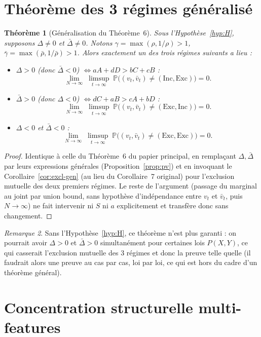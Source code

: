 \documentclass[12pt,a4paper]{article}
\newtheorem{theorem}{Théorème}[section]
\theoremstyle{remark}
\newtheorem{remark}[theorem]{Remarque}
\newcommand{\Inc}{\ensuremath{\mathrm{Inc}}}
\newcommand{\Exc}{\ensuremath{\mathrm{Exc}}}
\newcommand{\vbar}{\bar{v}}
\begin{document}
\section{Théorème des 3 régimes généralisé}

\begin{theorem}[Généralisation du Théorème~6]\label{thm:sel-gen}
Sous l'Hypothèse~\ref{hyp:H}, supposons $\Delta\ne0$ et $\bar\Delta\ne0$.
Notons $\gamma=\max(\rho,1/\rho)>1$, $\bar\gamma=\max(\bar\rho,1/\bar\rho)>1$.
Alors exactement un des trois régimes suivants a lieu :
\begin{itemize}
  \item $\Delta>0$ (donc $\bar\Delta<0$) $\iff aA+dD>bC+cB$ :
  \[
    \lim_{N\to\infty}\;\limsup_{t\to\infty}\;\mathbb P\bigl((v_t,\vbar_t)\ne(\Inc,\Exc)\bigr) = 0.
  \]
  \item $\bar\Delta>0$ (donc $\Delta<0$) $\iff dC+aB>cA+bD$ :
  \[
    \lim_{N\to\infty}\;\limsup_{t\to\infty}\;\mathbb P\bigl((v_t,\vbar_t)\ne(\Exc,\Inc)\bigr) = 0.
  \]
  \item $\Delta<0$ et $\bar\Delta<0$ :
  \[
    \lim_{N\to\infty}\;\limsup_{t\to\infty}\;\mathbb P\bigl((v_t,\vbar_t)\ne(\Exc,\Exc)\bigr) = 0.
  \]
\end{itemize}
\end{theorem}

\begin{proof}
Identique à celle du Théorème~6 du papier principal, en remplaçant
$\Delta,\bar\Delta$ par leurs expressions générales (Proposition~\ref{prop:pv})
et en invoquant le Corollaire~\ref{cor:excl-gen} (au lieu du Corollaire~7
original) pour l'exclusion mutuelle des deux premiers régimes. Le reste de
l'argument (passage du marginal au joint par union bound, sans hypothèse
d'indépendance entre $v_t$ et $\vbar_t$, puis $N\to\infty$) ne fait
intervenir ni $S$ ni $a$ explicitement et transfère donc sans changement.
\end{proof}

\begin{remark}
Sans l'Hypothèse~\ref{hyp:H}, ce théorème n'est plus garanti : on pourrait
avoir $\Delta>0$ et $\bar\Delta>0$ simultanément pour certaines lois
$P(X,Y)$, ce qui casserait l'exclusion mutuelle des 3 régimes et donc la
preuve telle quelle (il faudrait alors une preuve au cas par cas, loi par
loi, ce qui est hors du cadre d'un théorème général).
\end{remark}

\section{Concentration structurelle multi-features}
\end{document}
